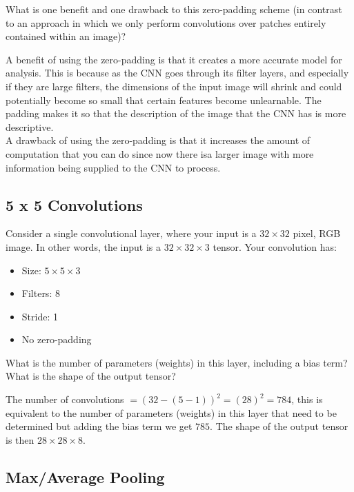 What is one benefit and one drawback to this zero-padding scheme (in contrast to an approach in which we only perform convolutions over patches entirely contained within an image)?

\begin{solution}
  A benefit of using the zero-padding is that it creates a more accurate model for analysis. This is because as the CNN goes through its filter layers, and especially if they are large filters, the dimensions of the input image will shrink and could potentially become so small that certain features become unlearnable. The padding makes it so that the description of the image that the CNN has is more descriptive. \\
  A drawback of using the zero-padding is that it increases the amount of computation that you can do since now there isa larger image with more information being supplied to the CNN to process.
\end{solution}

\subsection{5 x 5 Convolutions}

Consider a single convolutional layer, where your input is a $32 \times 32$ pixel, RGB image. In other words, the input is a $32 \times 32 \times 3$ tensor. Your convolution has:

\begin{itemize}
\item Size: $5 \times 5 \times 3$
\item Filters: 8
\item Stride: 1
\item No zero-padding
\end{itemize}

\problem[2] What is the number of parameters (weights) in this layer, including a bias term? What is the shape of the output tensor?

\begin{subsolution}
  The number of convolutions $= (32 - (5 - 1))^2 = (28)^2 = 784$, this is equivalent to the number of parameters (weights) in this layer that need to be determined but adding the bias term we get $785$. The shape of the output tensor is then $28 \times 28 \times 8$.
\end{subsolution}


 \subsection{Max/Average Pooling}

